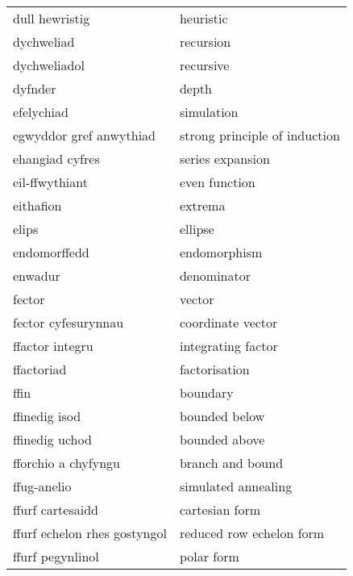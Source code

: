 \begin{supertabular}{p{0.22\textwidth}p{0.22\textwidth}}
                 dull hewristig &                        heuristic \\
                     dychweliad &                        recursion \\
                   dychweliadol &                        recursive \\
                        dyfnder &                            depth \\
                     efelychiad &                       simulation \\
        egwyddor gref anwythiad &    strong principle of induction \\
                ehangiad cyfres &                 series expansion \\
                 eil-ffwythiant &                    even function \\
                      eithafion &                          extrema \\
                          elips &                          ellipse \\
                   endomorffedd &                     endomorphism \\
                        enwadur &                      denominator \\
                         fector &                           vector \\
            fector cyfesurynnau &                coordinate vector \\
                ffactor integru &               integrating factor \\
                     ffactoriad &                    factorisation \\
                           ffin &                         boundary \\
                  ffinedig isod &                    bounded below \\
                 ffinedig uchod &                    bounded above \\
            fforchio a chyfyngu &                 branch and bound \\
                    ffug-anelio &              simulated annealing \\
               ffurf cartesaidd &                   cartesian form \\
   ffurf echelon rhes gostyngol &         reduced row echelon form \\
               ffurf pegynlinol &                       polar form \\

\end{supertabular}
